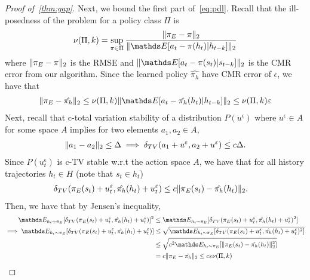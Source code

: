 \begin{proof}[Proof of~\cref{thm:gap}]
Next, we bound the first part of~\cref{eq:pdl}. Recall that the ill-posedness of the problem for a policy class $\Pi$ is
\begin{align*}
    \ill(\Pi,k)=\sup_{\pi\in\Pi} \frac{\norm{\pi_E-\pi}_2}{\norm{\expectE[a_t-\pi(h_t)\lvert h_{t-k}]}_2}
\end{align*}
where $\lVert\pi_E-\pi\rVert_2$ is the RMSE and $\norm{\expectE[a_t-\pi(s_t)\lvert s_{t-k}]}_2$ is the CMR error from our algorithm. Since the learned policy $\hat{\pi_h}$ have CMR error of $\epsilon$, we have that
\begin{align*}
\norm{\pi_E-\hat{\pi_h}}_2\leq \ill(\Pi,k){\norm{\expectE[a_t-\hat{\pi_h}(h_t)\lvert h_{t-k}]}_2} \leq \ill(\Pi,k)\epsilon 
\end{align*}
Next, recall that c-total variation stability of a distribution $P(u^\epsilon)$ where $u^\epsilon\in A$ for some space $A$ implies for two elements $a_1,a_2\in A$,
\begin{align*}
\lVert a_1-a_2\rVert_2\leq\Delta \implies \delta_{TV}(a_1+u^\varepsilon,a_2+u^\varepsilon)\leq c\Delta.
\end{align*}
Since $P(u^\epsilon_t)$ is c-TV stable w.r.t the action space $A$, we have that for all history trajectories $h_t\in H$ (note that $s_t\in h_t$)
\begin{align*}
\delta_{TV}(\pi_E(s_t)+u^\varepsilon_t,\hat{\pi_h}(h_t)+u^\varepsilon_t)&\leq c\lVert\pi_E(s_t)-\hat{\pi_h}(h_t)\rVert_2.
\end{align*}
Then, we have that by Jensen's inequality,
\begin{align*}
\expectE_{h_t\sim \pi_E}[\delta_{TV}(\pi_E(s_t)+u^\epsilon_t,\hat{\pi_h}(h_t)+u^\epsilon_t)]^2&\leq \expectE_{h_t\sim \pi_E}[\delta_{TV}(\pi_E(s_t)+u^\epsilon_t,\hat{\pi_h}(h_t)+u^\epsilon_t)^2]\\
\implies\expectE_{h_t\sim \pi_E}[\delta_{TV}(\pi_E(s_t)+u^\epsilon_t,\hat{\pi_h}(h_t)+u^\epsilon_t)]&\leq \sqrt{\expectE_{h_t\sim \pi_E}[\delta_{TV}(\pi_E(s_t)+u^\epsilon_t,\hat{\pi_h}(h_t)+u^\epsilon_t)^2]}\\
&\leq \sqrt{c^2\expectE_{h_t\sim \pi_E}[\norm{\pi_E(s_t)-\hat{\pi_h}(h_t)}^2_2]}\\
&=c \norm{\pi_E-\hat{\pi_h}}_2\leq c\epsilon\ill(\Pi,k)
\end{align*}


\end{proof}
